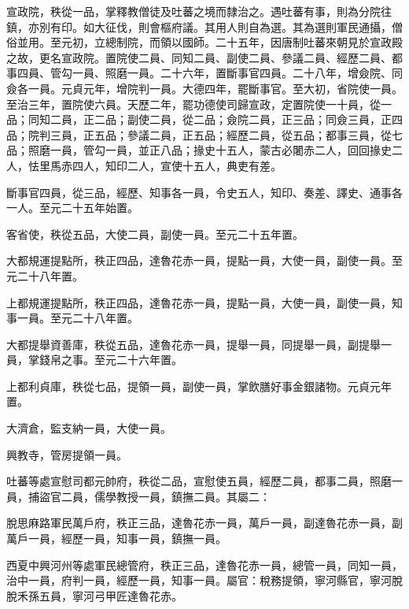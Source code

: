 \begin{pinyinscope}
 宣政院，秩從一品，掌釋教僧徒及吐蕃之境而隸治之。遇吐蕃有事，則為分院往鎮，亦別有印。如大征伐，則會樞府議。其用人則自為選。其為選則軍民通攝，僧俗並用。至元初，立總制院，而領以國師。二十五年，因唐制吐蕃來朝見於宣政殿之故，更名宣政院。置院使二員、同知二員、副使二員、參議二員、經歷二員、都事四員、管勾一員、照磨一員。二十六年，置斷事官四員。二十八年，增僉院、同僉各一員。元貞元年，增院判一員。大德四年，罷斷事官。至大初，省院使一員。至治三年，置院使六員。天歷二年，罷功德使司歸宣政，定置院使一十員，從一品；同知二員，正二品；副使二員，從二品；僉院二員，正三品；同僉三員，正四品；院判三員，正五品；參議二員，正五品；經歷二員，從五品；都事三員，從七品；照磨一員，管勾一員，並正八品；掾史十五人，蒙古必闍赤二人，回回掾史二人，怯里馬赤四人，知印二人，宣使十五人，典吏有差。



 斷事官四員，從三品，經歷、知事各一員，令史五人，知印、奏差、譯史、通事各一人。至元二十五年始置。



 客省使，秩從五品，大使二員，副使一員。至元二十五年置。



 大都規運提點所，秩正四品，達魯花赤一員，提點一員，大使一員，副使一員。至元二十八年置。



 上都規運提點所，秩正四品，達魯花赤一員，提點一員，大使一員，副使一員，知事一員。至元二十八年置。



 大都提舉資善庫，秩從五品，達魯花赤一員，提舉一員，同提舉一員，副提舉一員，掌錢帛之事。至元二十六年置。



 上都利貞庫，秩從七品，提領一員，副使一員，掌飲膳好事金銀諸物。元貞元年置。



 大濟倉，監支納一員，大使一員。



 興教寺，管房提領一員。



 吐蕃等處宣慰司都元帥府，秩從二品，宣慰使五員，經歷二員，都事二員，照磨一員，捕盜官二員，儒學教授一員，鎮撫二員。其屬二：



 脫思麻路軍民萬戶府，秩正三品，達魯花赤一員，萬戶一員，副達魯花赤一員，副萬戶一員，經歷一員，知事一員，鎮撫一員。



 西夏中興河州等處軍民總管府，秩正三品，達魯花赤一員，總管一員，同知一員，治中一員，府判一員，經歷一員，知事一員。屬官：稅務提領，寧河縣官，寧河脫脫禾孫五員，寧河弓甲匠達魯花赤。




\end{pinyinscope}
